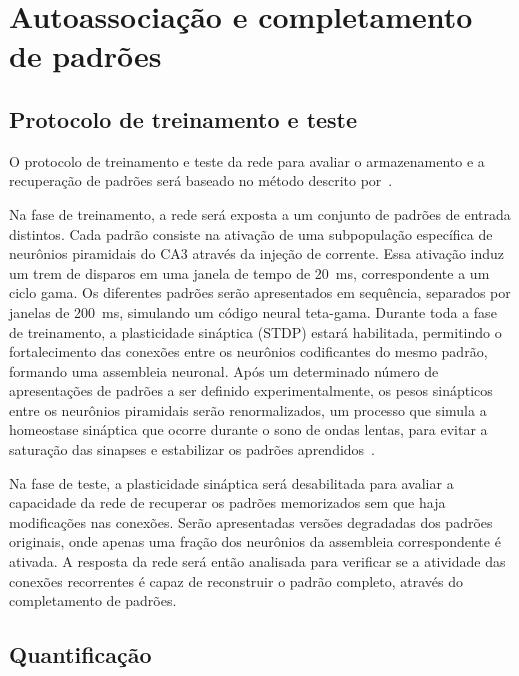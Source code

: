 \section{Autoassociação e completamento de padrões}

\subsection{Protocolo de treinamento e teste}\label{sec:protocolo_treinamento_teste}

O protocolo de treinamento e teste da rede para avaliar o armazenamento e a recuperação de padrões será baseado no método descrito
por~\cite{kopsickFormation2024}.

Na fase de treinamento, a rede será exposta a um conjunto de padrões de entrada distintos. Cada padrão consiste na ativação de uma
subpopulação específica de neurônios piramidais do CA3 através da injeção de corrente. Essa ativação induz um trem de disparos em
uma janela de tempo de \SI{20}{\milli\second}, correspondente a um ciclo gama. Os diferentes padrões serão apresentados em
sequência, separados por janelas de \SI{200}{\milli\second}, simulando um código neural teta-gama. Durante toda a fase de
treinamento, a plasticidade sináptica (STDP) estará habilitada, permitindo o fortalecimento das conexões entre os neurônios
codificantes do mesmo padrão, formando uma assembleia neuronal. Após um determinado número de apresentações de padrões a ser
definido experimentalmente, os pesos sinápticos entre os neurônios piramidais serão renormalizados, um processo que simula a
homeostase sináptica que ocorre durante o sono de ondas lentas, para evitar a saturação das sinapses e estabilizar os padrões
aprendidos~\cite{gonzalez-ruedaActivityDependent2018, kopsickFormation2024}.

Na fase de teste, a plasticidade sináptica será desabilitada para avaliar a capacidade da rede de recuperar os padrões memorizados
sem que haja modificações nas conexões. Serão apresentadas versões degradadas dos padrões originais, onde apenas uma fração dos
neurônios da assembleia correspondente é ativada. A resposta da rede será então analisada para verificar se a atividade das
conexões recorrentes é capaz de reconstruir o padrão completo, através do completamento de padrões.

\subsection{Quantificação}

